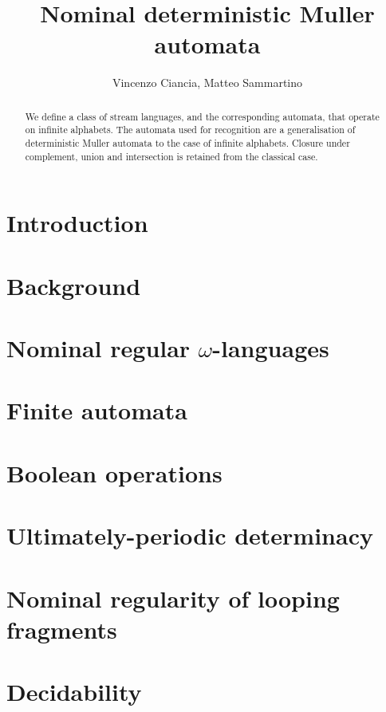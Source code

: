 \documentclass[orivec]{llncs}
\title{Nominal deterministic Muller automata}
\author{Vincenzo Ciancia, Matteo Sammartino}
\institute{}
\begin{document}
\maketitle

\begin{abstract}
 We define a class of stream languages, and the corresponding automata, that operate on infinite alphabets. The automata used for recognition are a generalisation of deterministic Muller automata to the case of infinite alphabets. Closure under complement, union and intersection is retained from the classical case.
\end{abstract}

\section{Introduction}\label{sec:introduction}

\section{Background}\label{sec:background}

\section{Nominal regular $\omega$-languages}\label{sec:languages}


\section{Finite automata}\label{sec:hd-automata}



\section{Boolean operations}\label{sec:boolean-operations}

\section{Ultimately-periodic determinacy}\label{sec:up-determinacy}

\section{Nominal regularity of looping fragments}\label{sec:regularity-of-loop}

\section{Decidability}\label{sec:decidability}



\end{document}
